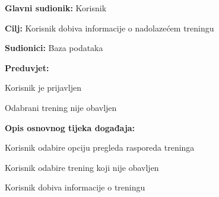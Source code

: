 \documentclass[times, utf8, zavrsni]{fer}
\newenvironment{packed_enum}{
	\begin{enumerate}
		\setlength{\itemsep}{0pt}
		\setlength{\parskip}{0pt}
		\setlength{\parsep}{0pt}
	}{\end{enumerate}}
\newenvironment{packed_item}{
	\begin{itemize}
		\setlength{\itemsep}{0pt}
		\setlength{\parskip}{0pt}
		\setlength{\parsep}{0pt}
	}{\end{itemize}}
\begin{document}
			\noindent {}
					\begin{packed_item}
						
						\item \textbf{Glavni sudionik: } Korisnik
						\item  \textbf{Cilj:} Korisnik dobiva informacije o nadolazećem treningu
						\item  \textbf{Sudionici:} Baza podataka
						\item  \textbf{Preduvjet:} 
						
						\item[] \begin{packed_enum}
							
							\item Korisnik je prijavljen
							\item Odabrani trening nije obavljen
							
							
						\end{packed_enum}
						
						\item  \textbf{Opis osnovnog tijeka događaja:}
						
						\item[] \begin{packed_enum}
							
							\item Korisnik odabire opciju pregleda rasporeda treninga
							\item Korisnik odabire trening koji nije obavljen
							\item Korisnik dobiva informacije o treningu
							
							
						\end{packed_enum}
						
					\end{packed_item}
					
\end{document}

